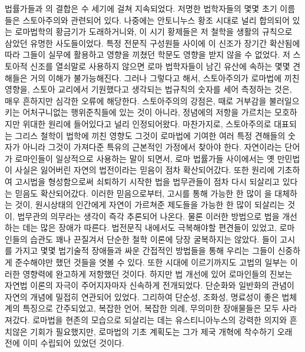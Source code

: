 법률가들과 의 결합은 수 세기에 걸쳐 지속되었다.
저명한 법학자들의 몇몇 초기 이름들은 스토아주의와 관련되어 있다.
나중에는 안토니누스 황조 시대로 널리 합의되어 있는
로마법학의 황금기가 도래하거니와,
이 시기 황제들은 저 철학을 생활의 규칙으로 삼았던 유명한 사도들이었다.
특정 전문직 구성원들 사이에 이 신조가 장기간 확산됨에 따라
그들이 실무에 활용하고 영향을 끼쳤던 학문도 영향을 받지 않을 수 없었다.
저 스토아적 신조를 열쇠말로 사용하지 않으면
로마 법학자들이 남긴 유산에 속하는 몇몇 견해들은 거의 이해가 불가능해진다.
그러나 그렇다고 해서,
스토아주의가 로마법에 끼친 영향을,
스토아 교리에서 기원했다고 생각되는 법규칙의 숫자를 세어 측정하는 것은,
매우 흔하지만 심각한 오류에 해당한다.
스토아주의의 강점은,
때로 거부감을 불러일으키는 어처구니없는 행위준칙들에 있는 것이 아니라,
정념에의 저항을 가르치는 모호하지만 위대한 원리에 들어있다고 널리 인정되어왔다.
마찬가지로, 스토아주의로 대표되는 그리스 철학이 법학에 끼친 영향도
그것이 로마법에 기여한 여러 특정 견해들의 숫자가 아니라
그것이 가져다준 특유의 근본적인 가정에서 찾아야 한다.
자연이라는 단어가 로마인들이 일상적으로 사용하는 말이 되면서,
로마 법률가들 사이에서는
옛 만민법이 사실은 잃어버린 자연의 법전이라는 믿음이
점차 확산되어갔다.
또한  원리에 기초하여 고시법을 형성함으로써
쇠퇴하기 시작한 법을 법무관들이 점차 다시 되살리고 있다는 믿음도 확산되어갔다.
이러한 믿음으로부터,
고시를 통해 가능한 한 많이 을 대체하는 것이,
원시상태의 인간에게 자연이 가르쳐준 제도들을 가능한 한 많이 되살리는 것이,
법무관의 의무라는 생각이 즉각 추론되어 나온다.
물론 이러한 방법으로 법을 개선하는 데는 많은 장애가 따른다.
법전문직 내에서도 극복해야할 편견들이 있었고,
로마인들의 습관도 꽤나 끈질겨서 단순한 철학 이론에 당장 굴복하지는 않았다.
들이 고시를 가지고 몇몇 법기술적 장애들과 싸운 간접적인 방법들을 통해
우리는 그들이 신중하게 준수해야만 했던 것들을 엿볼 수 있다.
또한  시대에 이르기까지도 고법의 일부는
이러한 영향력에 완고하게 저항했던 것이다.
하지만 법 개선에 있어 로마인들의 진보는
자연법 이론의 자극이 주어지자마자 신속하게 전개되었다.
단순화와 일반화의 관념이 자연의 개념에 밀접히 연관되어 있었다.
그리하여 단순성, 조화성, 명료성이 좋은 법체계의 특징으로 간주되었고,
복잡한 언어, 복잡한 의례, 무의미한 장애물들은
모두 사라져갔다.
로마법을 현존의 모습으로 되살리는 데는
유스티니아누스의 강력한 의지와 흔치않은 기회가 필요했지만,
로마법의 기초 계획도는 그가 제국 개혁에 착수하기 오래 전에
이미 수립되어 있었던 것이다.


